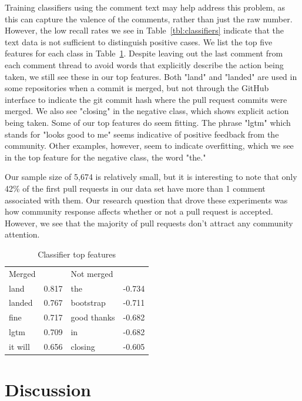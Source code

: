 \documentclass{sigchi}
\begin{document}
Training classifiers using the comment text may help address this problem, as
this can capture the valence of the comments, rather than just the raw number.
However, the low recall rates we see in Table~\ref{tbl:classifiers} indicate
that the text data is not sufficient to distinguish positive cases. We list the
top five features for each class in Table~\ref{tbl:features}. Despite leaving
out the last comment from each comment thread to avoid words that explicitly
describe the action being taken, we still see these in our top features. Both
"land" and "landed" are used in some repositories when a commit is merged, but
not through the GitHub interface to indicate the git commit hash where the pull
request commits were merged. We also see "closing" in the negative class, which
shows explicit action being taken. Some of our top features do seem fitting. The
phrase "lgtm" which stands for "looks good to me" seems indicative of positive
feedback from the community. Other examples, however, seem to indicate
overfitting, which we see in the top feature for the negative class, the word
"the."

Our sample size of 5,674 is relatively small, but it is interesting to note that
only 42\% of the first pull requests in our data set have more than 1 comment
associated with them. Our research question that drove these experiments was how
community response affects whether or not a pull request is accepted. However,
we see that the majority of pull requests don't attract any community attention.

\begin{table}[ht] \centering
\caption{Classifier top features}
\label{tbl:features}
\begin{tabular}{ll|ll}
\hline\hline
Merged  & ~     & Not merged  & ~      \\
land    & 0.817 & the         & -0.734 \\
landed  & 0.767 & bootstrap   & -0.711 \\
fine    & 0.717 & good thanks & -0.682 \\
lgtm    & 0.709 & in          & -0.682 \\
it will & 0.656 & closing     & -0.605 \\
\hline
\end{tabular}
\end{table}

\section{Discussion} \label{chap:conclusion}
\end{document}
